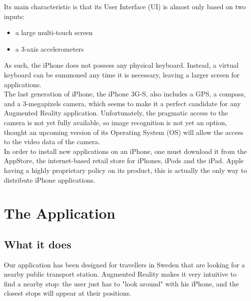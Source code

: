 Its main characteristic is that its User Interface (UI) is almost only based on two inputs:
\begin{itemize}
\item{a large multi-touch screen}
\item{a 3-axis accelerometers}
\end{itemize}
As such, the iPhone does not possess any physical keyboard. Instead, a virtual keyboard can be summoned any time it is necessary, leaving a larger screen for applications.\\

The last generation of iPhone, the iPhone 3G-S, also includes a GPS, a compass, and a 3-megapixels camera, which seems to make it a perfect candidate for any Augmented Reality application. Unfortunately, the pragmatic access to the camera is not yet fully available, so image recognition is not yet an option, thought an upcoming version of its Operating System (OS) will allow the access to the video data of the camera.\\

In order to install new applications on an iPhone, one must download it from the AppStore, the internet-based retail store for iPhones, iPods and the iPad. Apple having a highly proprietary policy on its product, this is actually the only way to distribute iPhone applications.

\section{The Application}
\label{sec:the_application}

\subsection{What it does}

Our application has been designed for travellers in Sweden that are looking for a nearby public transport station. Augmented Reality makes it very intuitive to find a nearby stop: the user just has to "look around" with his iPhone, and the closest stops will appear at their positions.\\


